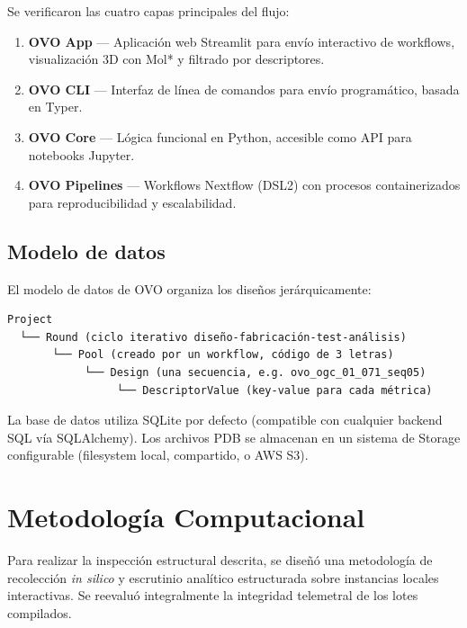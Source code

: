 \documentclass[10pt,a4paper,twocolumn]{article}
\begin{document}
Se verificaron las cuatro capas principales del flujo:

\begin{enumerate}
    \item \textbf{OVO App} — Aplicación web Streamlit para envío interactivo de workflows, visualización 3D con Mol* y filtrado por descriptores.

    \item \textbf{OVO CLI} — Interfaz de línea de comandos para envío programático, basada en Typer.

    \item \textbf{OVO Core} — Lógica funcional en Python, accesible como API para notebooks Jupyter.

    \item \textbf{OVO Pipelines} — Workflows Nextflow (DSL2) con procesos containerizados para reproducibilidad y escalabilidad.
\end{enumerate}

\subsection{Modelo de datos}

El modelo de datos de OVO organiza los diseños jerárquicamente:

\begin{verbatim}
Project
  └── Round (ciclo iterativo diseño-fabricación-test-análisis)
       └── Pool (creado por un workflow, código de 3 letras)
            └── Design (una secuencia, e.g. ovo_ogc_01_071_seq05)
                 └── DescriptorValue (key-value para cada métrica)
\end{verbatim}

La base de datos utiliza SQLite por defecto (compatible con cualquier backend SQL vía SQLAlchemy). Los archivos PDB se almacenan en un sistema de Storage configurable (filesystem local, compartido, o AWS S3).

\section{Metodología Computacional}

Para realizar la inspección estructural descrita, se diseñó una metodología de recolección \textit{in silico} y escrutinio analítico estructurada sobre instancias locales interactivas. Se reevaluó integralmente la integridad telemetral de los lotes compilados.
\end{document}
